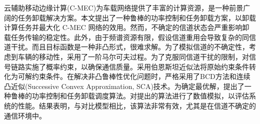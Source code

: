云辅助移动边缘计算(C-MEC)为车载网络提供了丰富的计算资源，是一种前景广阔的任务卸载解决方案。本文提出了一种鲁棒的功率控制和任务卸载方案，以卸载计算任务并最大化 C-MEC 网络的效用。然而，不确定的信道状态会严重影响卸载任务传输的稳定性。此外，由于频谱资源有限，假设信道重用会导致复杂的同信道干扰。而且目标函数是一种非凸形式，很难求解。为了模拟信道的不确定性，考虑到车辆的移动性，采用了一阶马尔可夫过程。为了克服同信道干扰的限制，对信号链路实施了概率约束，以确保通信质量。采用伯恩斯坦近似法将原始约束条件转化为可解约束条件。在解决非凸鲁棒性优化问题时，严格采用了BCD方法和连续凸近似(Successive Convex Approximation, SCA)技术。为确定最优解，提出了一种鲁棒的功率控制和任务卸载调度算法。对提出的算法进行了数值模拟，以评估系统的性能。结果表明，与对比模型相比，该算法非常有效，尤其是在信道不确定的通信环境中。

